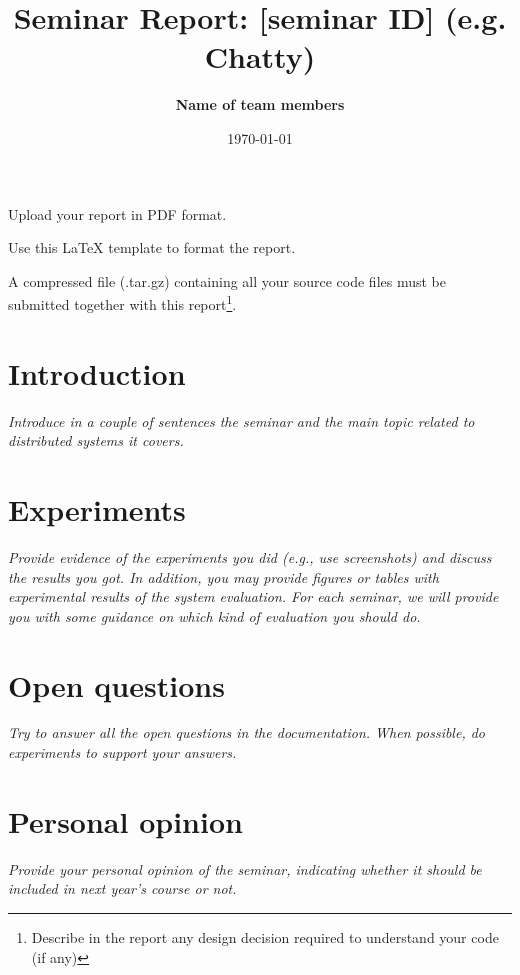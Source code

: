 \documentclass[a4paper, 10pt]{article}
\title{Seminar Report: [seminar ID] (e.g. Chatty)}
\author{\textbf{Name of team members}}
\date{\normalsize\today{}}
\begin{document}
\maketitle

\begin{center}
  Upload your report in PDF format.
  
  Use this LaTeX template to format the report.
  
	A compressed file (.tar.gz) containing all your source code files must be submitted together with this report\footnote{Describe in the report any design decision required to understand your code (if any)}.
\end{center}

\section{Introduction}

\textit{Introduce in a couple of sentences the seminar and the main topic related to distributed systems it covers.}

\section{Experiments}

\textit{Provide evidence of the experiments you did (e.g., use screenshots) and discuss the results you got. In addition, you may provide figures or tables with experimental results of the system evaluation. For each seminar, we will provide you with some guidance on which kind of evaluation you should do.}

\section{Open questions}

\textit{Try to answer all the open questions in the documentation. When possible, do experiments to support your answers.}

\section{Personal opinion}

\textit{Provide your personal opinion of the seminar, indicating whether it should be included in next year's course or not.}
\end{document}
